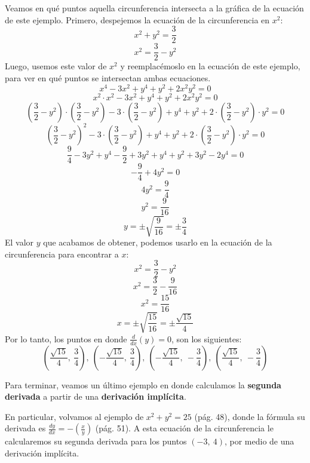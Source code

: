 \documentclass[12pt]{article}
\begin{document}
\newpage

Veamos en qué puntos aquella circunferencia intersecta a la gráfica de la ecuación de este ejemplo. Primero, despejemos la ecuación de la circunferencia en $x^{2}$:
\[x^{2} + y^{2} = \frac{3}{2}\]
\[x^{2} = \frac{3}{2} - y^{2}\]
Luego, usemos este valor de $x^{2}$ y reemplacémoslo en la ecuación de este ejemplo, para ver en qué puntos se intersectan ambas ecuaciones.
\[x^{4} - 3x^{2} + y^{4} + y^{2} + 2x^{2}y^{2} = 0\]
\[x^{2} \cdot x^{2} - 3x^{2} + y^{4} + y^{2} + 2x^{2}y^{2} = 0\]
\[\left(\frac{3}{2} - y^{2}\right) \cdot \left(\frac{3}{2} - y^{2}\right) - 3 \cdot \left(\frac{3}{2} - y^{2}\right) + y^{4} + y^{2} + 2 \cdot \left(\frac{3}{2} - y^{2}\right) \cdot y^{2} = 0\]
\[\left(\frac{3}{2} - y^{2}\right)^{2} - 3 \cdot \left(\frac{3}{2} - y^{2}\right) + y^{4} + y^{2} + 2 \cdot \left(\frac{3}{2} - y^{2}\right) \cdot y^{2} = 0\]
\[\frac{9}{4} - 3y^{2} + y^{4} - \frac{9}{2} + 3y^{2} + y^{4} + y^{2} + 3y^{2} - 2y^{4} = 0\]
\[- \frac{9}{4} + 4y^{2} = 0\]
\[4y^{2} = \frac{9}{4}\]
\[y^{2} = \frac{9}{16}\]
\[y = \pm \sqrt{\frac{9}{16}} = \pm \frac{3}{4}\]
El valor $y$ que acabamos de obtener, podemos usarlo en la ecuación de la circunferencia para encontrar a $x$:
\[x^{2} = \frac{3}{2} - y^{2}\]
\[x^{2} = \frac{3}{2} - \frac{9}{16}\]
\[x^{2} = \frac{15}{16}\]
\[x = \pm \sqrt{\frac{15}{16}} = \pm \frac{\sqrt{15}}{4}\]
Por lo tanto, los puntos en donde $\frac{d}{dx} (y) = 0$, son los siguientes:
\[\left(\frac{\sqrt{15}}{4}, \ \frac{3}{4}\right), \ \left(-\frac{\sqrt{15}}{4}, \ \frac{3}{4}\right), \ \left(-\frac{\sqrt{15}}{4}, \ -\frac{3}{4}\right), \ \left(\frac{\sqrt{15}}{4}, \ -\frac{3}{4}\right)\]

Para terminar, veamos un último ejemplo en donde calculamos la \textbf{segunda derivada} a partir de una \textbf{derivación implícita}.

En particular, volvamos al ejemplo de $x^{2} + y^{2} = 25$ (pág. 48), donde la fórmula su derivada es $\frac{dy}{dx} = -\left(\frac{x}{y}\right)$ (pág. 51). A esta ecuación de la circunferencia le calcularemos su segunda derivada para los puntos $(-3, \ 4)$, por medio de una derivación implícita.
\end{document}
